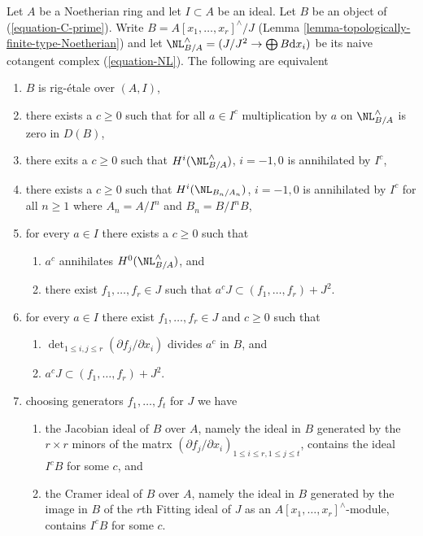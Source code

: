 \begin{lemma}
\label{lemma-equivalent-with-artin}
Let $A$ be a Noetherian ring and let $I \subset A$ be an ideal.
Let $B$ be an object of (\ref{equation-C-prime}). Write
$B = A[x_1, \ldots, x_r]^\wedge/J$
(Lemma \ref{lemma-topologically-finite-type-Noetherian})
and let $\NL_{B/A}^\wedge = (J/J^2 \to \bigoplus B\text{d}x_i)$
be its naive cotangent complex (\ref{equation-NL}).
The following are equivalent
\begin{enumerate}
\item $B$ is rig-\'etale over $(A, I)$,
\item
\label{item-zero-on-NL}
there exists a $c \geq 0$ such that for all $a \in I^c$ multiplication by $a$
on $\NL_{B/A}^\wedge$ is zero in $D(B)$,
\item
\label{item-zero-on-cohomology-NL}
there exits a $c \geq 0$ such that $H^i(\NL_{B/A}^\wedge)$, $i = -1, 0$ is
annihilated by $I^c$,
\item
\label{item-zero-on-cohomology-NL-truncations}
there exists a $c \geq 0$ such that $H^i(\NL_{B_n/A_n})$, $i = -1, 0$ is
annihilated by $I^c$ for all $n \geq 1$ where $A_n = A/I^n$ and $B_n = B/I^nB$,
\item
\label{item-condition-artin-pre-pre}
for every $a \in I$ there exists a $c \geq 0$ such that
\begin{enumerate}
\item $a^c$ annihilates $H^0(\NL_{B/A}^\wedge)$, and
\item there exist $f_1, \ldots, f_r \in J$ such that
$a^c J \subset (f_1, \ldots, f_r) + J^2$.
\end{enumerate}
\item
\label{item-condition-artin-pre}
for every $a \in I$ there exist $f_1, \ldots, f_r \in J$ and $c \geq 0$
such that
\begin{enumerate}
\item $\det_{1 \leq i, j \leq r}(\partial f_j/\partial x_i)$ divides
$a^c$ in $B$, and
\item $a^c J \subset (f_1, \ldots, f_r) + J^2$.
\end{enumerate}
\item
\label{item-condition-artin}
choosing generators $f_1, \ldots, f_t$ for $J$ we have
\begin{enumerate}
\item the Jacobian ideal of $B$ over $A$, namely the ideal in $B$
generated by the $r \times r$ minors of the matrx
$(\partial f_j/\partial x_i)_{1 \leq i \leq r, 1 \leq j \leq t}$,
contains the ideal $I^cB$ for some $c$, and
\item the Cramer ideal of $B$ over $A$, namely the ideal in $B$
generated by the image in $B$ of the $r$th Fitting ideal of $J$
as an $A[x_1, \ldots, x_r]^\wedge$-module, contains $I^cB$ for some $c$.
\end{enumerate}
\end{enumerate}
\end{lemma}

